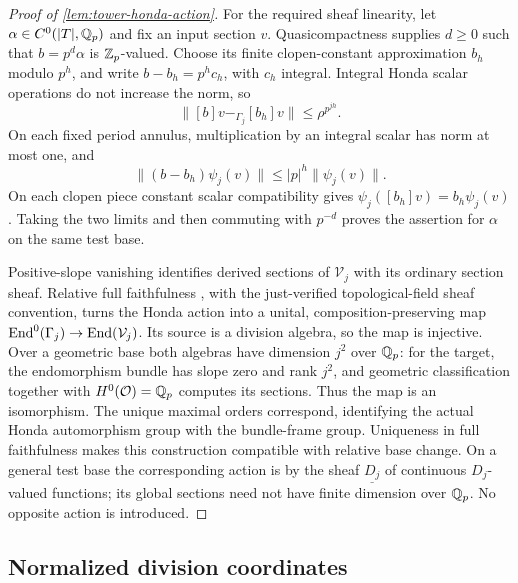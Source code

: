 \begin{proof}[Proof of \cref{lem:tower-honda-action}]
For the required sheaf linearity, let
$\alpha\in C^0(|T|,\mathbb Q_p)$ and fix an input section $v$.
Quasicompactness supplies $d\geq0$ such that $b=p^d\alpha$ is
$\mathbb Z_p$-valued. Choose its finite clopen-constant approximation $b_h$
modulo $p^h$, and write $b-b_h=p^hc_h$, with $c_h$ integral.
Integral Honda scalar operations do not increase the norm, so
\[
 \|[b]v-_{\Gamma_j}[b_h]v\|\leq\rho^{p^{jh}}.
\]
On each fixed period annulus, multiplication by an integral scalar
has norm at most one, and
\[
 \|(b-b_h)\psi_j(v)\|\leq |p|^h\|\psi_j(v)\|.
\]
On each clopen piece constant scalar compatibility gives
$\psi_j([b_h]v)=b_h\psi_j(v)$. Taking the two limits and then
commuting with $p^{-d}$ proves the assertion for $\alpha$ on the
same test base.

Positive-slope vanishing identifies derived sections of
$\mathcal V_j$ with its ordinary section sheaf. Relative full
faithfulness \citep[Corollary~3.11]{anschutzLeBras2025}, with the
just-verified topological-field sheaf convention, turns the Honda
action into a unital, composition-preserving map
$\operatorname{End}^0(\Gamma_j)\to\operatorname{End}(\mathcal V_j)$. Its source is a division
algebra, so the map is injective. Over a geometric base both algebras
have dimension $j^2$
over $\mathbb Q_p$: for the target, the endomorphism bundle has slope zero
and rank $j^2$, and geometric classification together with
$H^0(\mathcal O)=\mathbb Q_p$ computes its sections. Thus the map is an
isomorphism. The unique maximal orders correspond, identifying the
actual Honda automorphism group with the bundle-frame group.
Uniqueness in full faithfulness makes this construction compatible
with relative base change. On a general test base the corresponding
action is by the sheaf $\underline{D_j}$ of continuous $D_j$-valued
functions; its global sections need not have finite dimension over
$\mathbb Q_p$. No opposite action is introduced.
\end{proof}

\subsection{Normalized division coordinates}

